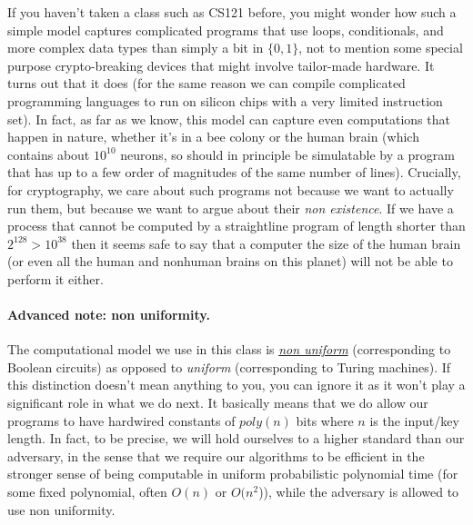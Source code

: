 If you haven't taken a class such as CS121 before, you might wonder how
such a simple model captures complicated programs that use loops,
conditionals, and more complex data types than simply a bit in
\(\{0,1\}\), not to mention some special purpose crypto-breaking devices
that might involve tailor-made hardware. It turns out that it does (for
the same reason we can compile complicated programming languages to run
on silicon chips with a very limited instruction set). In fact, as far
as we know, this model can capture even computations that happen in
nature, whether it's in a bee colony or the human brain (which contains
about \(10^{10}\) neurons, so should in principle be simulatable by a
program that has up to a few order of magnitudes of the same number of
lines). Crucially, for cryptography, we care about such programs not
because we want to actually run them, but because we want to argue about
their \emph{non existence}. If we have a process that cannot be computed
by a straightline program of length shorter than \(2^{128}>10^{38}\)
then it seems safe to say that a computer the size of the human brain
(or even all the human and nonhuman brains on this planet) will not be
able to perform it either.

\paragraph{Advanced note: non uniformity.} The computational model we
use in this class is
\href{https://introtcs.org/public/lec_11_running_time.html\#nonuniformcompsec}{\emph{non
uniform}} (corresponding to Boolean circuits) as opposed to
\emph{uniform} (corresponding to Turing machines). If this distinction
doesn't mean anything to you, you can ignore it as it won't play a
significant role in what we do next. It basically means that we do allow
our programs to have hardwired constants of \(poly(n)\) bits where \(n\)
is the input/key length. In fact, to be precise, we will hold ourselves
to a higher standard than our adversary, in the sense that we require
our algorithms to be efficient in the stronger sense of being computable
in uniform probabilistic polynomial time (for some fixed polynomial,
often \(O(n)\) or \(O(n^2\))), while the adversary is allowed to use non
uniformity.

